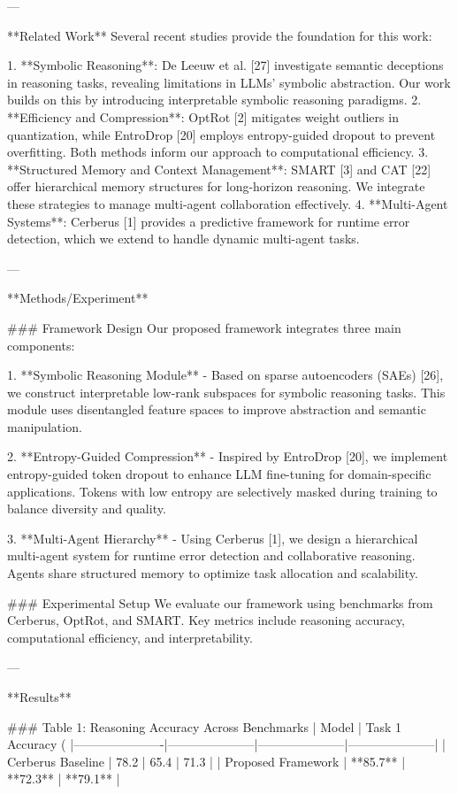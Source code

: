 ---

**Related Work**  
Several recent studies provide the foundation for this work:  

1. **Symbolic Reasoning**: De Leeuw et al. [27] investigate semantic deceptions in reasoning tasks, revealing limitations in LLMs' symbolic abstraction. Our work builds on this by introducing interpretable symbolic reasoning paradigms.  
2. **Efficiency and Compression**: OptRot [2] mitigates weight outliers in quantization, while EntroDrop [20] employs entropy-guided dropout to prevent overfitting. Both methods inform our approach to computational efficiency.  
3. **Structured Memory and Context Management**: SMART [3] and CAT [22] offer hierarchical memory structures for long-horizon reasoning. We integrate these strategies to manage multi-agent collaboration effectively.  
4. **Multi-Agent Systems**: Cerberus [1] provides a predictive framework for runtime error detection, which we extend to handle dynamic multi-agent tasks.  

---

**Methods/Experiment**  

### Framework Design  
Our proposed framework integrates three main components:  

1. **Symbolic Reasoning Module**  
   - Based on sparse autoencoders (SAEs) [26], we construct interpretable low-rank subspaces for symbolic reasoning tasks. This module uses disentangled feature spaces to improve abstraction and semantic manipulation.  

2. **Entropy-Guided Compression**  
   - Inspired by EntroDrop [20], we implement entropy-guided token dropout to enhance LLM fine-tuning for domain-specific applications. Tokens with low entropy are selectively masked during training to balance diversity and quality.  

3. **Multi-Agent Hierarchy**  
   - Using Cerberus [1], we design a hierarchical multi-agent system for runtime error detection and collaborative reasoning. Agents share structured memory to optimize task allocation and scalability.  

### Experimental Setup  
We evaluate our framework using benchmarks from Cerberus, OptRot, and SMART. Key metrics include reasoning accuracy, computational efficiency, and interpretability.  

---

**Results**  

### Table 1: Reasoning Accuracy Across Benchmarks  
| Model                | Task 1 Accuracy (%
|----------------------|---------------------|---------------------|---------------------|  
| Cerberus Baseline    | 78.2               | 65.4               | 71.3               |  
| Proposed Framework   | **85.7**           | **72.3**           | **79.1**           |  


